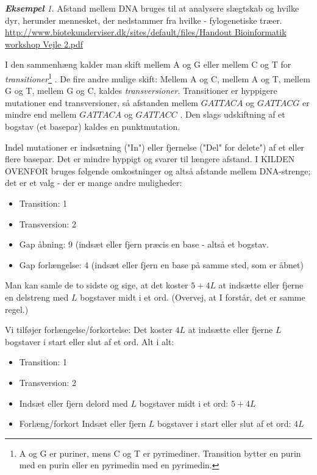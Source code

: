 \documentclass[a4paper, 12pt]{article}
\theoremstyle{remark}
\newtheorem{Eksempel}{\textbf{Eksempel}}
\begin{document}
\begin{Eksempel}
Afstand mellem DNA bruges til at analysere slægtskab og hvilke dyr, herunder mennesket, der nedstammer fra hvilke - fylogenetiske træer.\\ \url{ http://www.biotekunderviser.dk/sites/default/files/Handout Bioinformatik workshop Vejle 2.pdf}

I den sammenhæng kalder man skift mellem A og G eller mellem C og T for \emph{transitioner}\footnote{A og G er puriner, mens C og T er pyrimediner. Transition bytter en purin med en purin eller en pyrimedin med en pyrimedin.} . De fire andre mulige skift: Mellem A og C, mellem A og T, mellem G og T, mellem G og C, kaldes \emph{transversioner}. Transitioner er hyppigere mutationer end transversioner, så afstanden mellem $GATTACA$ og $GATTACG$ er mindre end mellem $GATTACA$ og $GATTACC$ . Den slags udskiftning af et bogstav (et basepar) kaldes en punktmutation.

Indel mutationer er indsætning ("In") eller fjernelse ("Del" for delete") af et eller flere basepar. Det er mindre hyppigt og svarer til længere afstand. I  KILDEN OVENFOR bruges følgende omkostninger og altså afstande mellem DNA-strenge; det er et valg - der er mange andre muligheder: 
\begin{itemize}
\item Transition: 1
\item Transversion: 2
\item Gap åbning: 9 (indsæt eller fjern præcis en base - altså et bogstav.
\item Gap forlængelse: 4 (indsæt eller fjern en base på samme sted, som er åbnet)
\end{itemize}
Man kan samle de to sidste og sige, at det koster $5+4L$ at indsætte eller fjerne en delstreng med $L$ bogstaver midt i et ord. (Overvej, at I forstår, det er samme regel.)

Vi tilføjer forlængelse/forkortelse: Det koster $4L$ at indsætte eller fjerne $L$ bogstaver i start eller slut af et ord.  Alt i alt:
\begin{itemize}
\item Transition: 1
\item Transversion: 2
\item Indsæt eller fjern delord med $L$ bogstaver midt i et ord: $5+4L$
\item Forlæng/forkort Indsæt eller fjern $L$ bogstaver i start eller slut af et ord: $4L$
\end{itemize}
\end{Eksempel}
\end{document}
